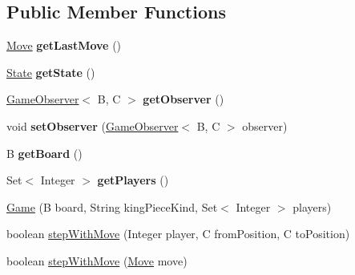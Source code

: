\subsection*{Public Member Functions}
\begin{DoxyCompactItemize}
\item 
\hyperlink{classedu_1_1xwei12_1_1chess_1_1_game_1_1_move}{Move} {\bfseries get\+Last\+Move} ()\hypertarget{classedu_1_1xwei12_1_1chess_1_1_game_ad843442663651a03eb4132c0241a342e}{}\label{classedu_1_1xwei12_1_1chess_1_1_game_ad843442663651a03eb4132c0241a342e}

\item 
\hyperlink{enumedu_1_1xwei12_1_1chess_1_1_game_1_1_state}{State} {\bfseries get\+State} ()\hypertarget{classedu_1_1xwei12_1_1chess_1_1_game_ae78b7a50f0897055e481e4c4632e12f9}{}\label{classedu_1_1xwei12_1_1chess_1_1_game_ae78b7a50f0897055e481e4c4632e12f9}

\item 
\hyperlink{interfaceedu_1_1xwei12_1_1chess_1_1_game_observer}{Game\+Observer}$<$ B, C $>$ {\bfseries get\+Observer} ()\hypertarget{classedu_1_1xwei12_1_1chess_1_1_game_a1efaaa2664308ed588198a58fdc825c2}{}\label{classedu_1_1xwei12_1_1chess_1_1_game_a1efaaa2664308ed588198a58fdc825c2}

\item 
void {\bfseries set\+Observer} (\hyperlink{interfaceedu_1_1xwei12_1_1chess_1_1_game_observer}{Game\+Observer}$<$ B, C $>$ observer)\hypertarget{classedu_1_1xwei12_1_1chess_1_1_game_a9e1102981a0c3eed0f27ff09f1c7782b}{}\label{classedu_1_1xwei12_1_1chess_1_1_game_a9e1102981a0c3eed0f27ff09f1c7782b}

\item 
B {\bfseries get\+Board} ()\hypertarget{classedu_1_1xwei12_1_1chess_1_1_game_a325e66ff4bc5a0bd2666c62503ef29e2}{}\label{classedu_1_1xwei12_1_1chess_1_1_game_a325e66ff4bc5a0bd2666c62503ef29e2}

\item 
Set$<$ Integer $>$ {\bfseries get\+Players} ()\hypertarget{classedu_1_1xwei12_1_1chess_1_1_game_afdd5adf51a8823f7646f34fff13e46b3}{}\label{classedu_1_1xwei12_1_1chess_1_1_game_afdd5adf51a8823f7646f34fff13e46b3}

\item 
\hyperlink{classedu_1_1xwei12_1_1chess_1_1_game_a43189f98fe6e899f366c8ac7bbfb61e7}{Game} (B board, String king\+Piece\+Kind, Set$<$ Integer $>$ players)
\item 
boolean \hyperlink{classedu_1_1xwei12_1_1chess_1_1_game_a12ad80191d2c60235a22a5bf9f3177d2}{step\+With\+Move} (Integer player, C from\+Position, C to\+Position)
\item 
boolean \hyperlink{classedu_1_1xwei12_1_1chess_1_1_game_a841659e99ee44e25b269f70da04c666c}{step\+With\+Move} (\hyperlink{classedu_1_1xwei12_1_1chess_1_1_game_1_1_move}{Move} move)
\end{DoxyCompactItemize}

